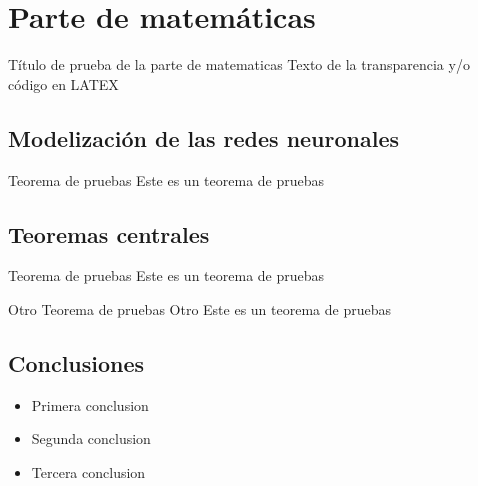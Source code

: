 \section{Parte de matemáticas}

\begin{frame}{Título de prueba de la parte de matematicas}
	Texto de la transparencia y/o código en LATEX
\end{frame}

\subsection{Modelización de las redes neuronales}
\begin{frame}
	\begin{block}{Teorema de pruebas}
		Este es un teorema de pruebas
	\end{block}
\end{frame}

\subsection{Teoremas centrales}
\begin{frame}
	\begin{block}{Teorema de pruebas}
		Este es un teorema de pruebas
	\end{block}

	\begin{block}{Otro Teorema de pruebas}
		Otro Este es un teorema de pruebas
	\end{block}
\end{frame}

\subsection{Conclusiones}
\begin{frame}
	\begin{itemize}
		\item Primera conclusion
		\item Segunda conclusion
		\item Tercera conclusion
	\end{itemize}
\end{frame}
